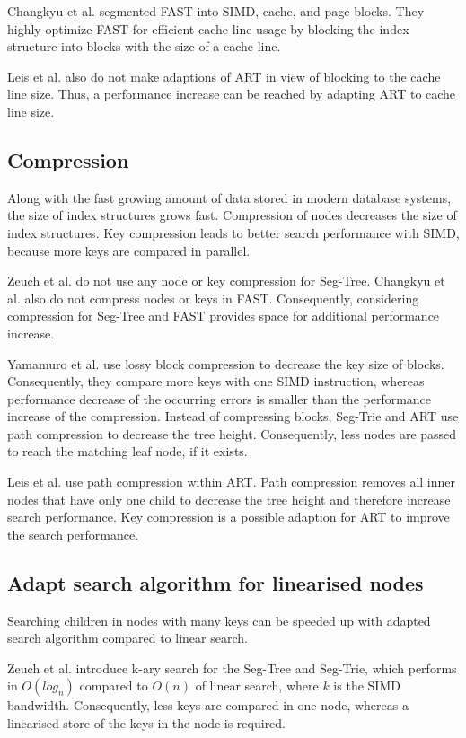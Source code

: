 \documentclass[conference]{IEEEtran}
\begin{document}
Changkyu et al. segmented FAST into SIMD, cache, and page blocks. They highly optimize FAST for efficient cache line usage by blocking the index structure into blocks with the size of a cache line.

Leis et al. also do not make adaptions of ART in view of blocking to the cache line size. Thus, a performance increase can be reached by adapting ART to cache line size.
\subsection{Compression}
Along with the fast growing amount of data stored in modern database systems, the size of index structures grows fast. Compression of nodes decreases the size of index structures. Key compression leads to better search performance with SIMD, because more keys are compared in parallel.

Zeuch et al. do not use any node or key compression for Seg-Tree. Changkyu et al. also do not compress nodes or keys in FAST. Consequently, considering compression for Seg-Tree and FAST provides space for additional performance increase.

Yamamuro et al. use lossy block compression to decrease the key size of blocks. Consequently, they compare more keys with one SIMD instruction, whereas performance decrease of the occurring errors is smaller than the performance increase of the compression. Instead of compressing blocks, Seg-Trie and ART use path compression to decrease the tree height. Consequently, less nodes are passed to reach the matching leaf node, if it exists.

Leis et al. use path compression within ART. Path compression removes all inner nodes that have only one child to decrease the tree height and therefore increase search performance. Key compression is a possible adaption for ART to improve the search performance.

\subsection{Adapt search algorithm for linearised nodes}
Searching children in nodes with many keys can be speeded up with adapted search algorithm compared to linear search.

Zeuch et al. introduce k-ary search for the Seg-Tree and Seg-Trie, which performs in $O(log_n)$ compared to $O(n)$ of linear search, where $k$ is the SIMD bandwidth. Consequently, less keys are compared in one node, whereas a linearised store of the keys in the node is required. 
\end{document}
